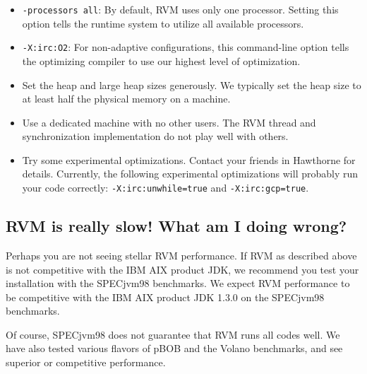\begin{itemize}
\item {\tt -processors all}: By default, RVM uses only one processor.  Setting this option tells the runtime system to utilize all available processors.
\item {\tt -X:irc:O2}: For non-adaptive configurations, this command-line option tells the optimizing compiler to use our highest level of optimization.
\item Set the heap and large heap sizes generously.  We typically set the heap size to at least half the physical memory on a machine.
\item Use a dedicated machine with no other users.  The RVM thread and synchronization implementation do not play well with others.
\item Try some experimental optimizations.  Contact your friends in Hawthorne
for details.  Currently, the following experimental optimizations will 
probably run your code correctly: {\tt -X:irc:unwhile=true} and {\tt -X:irc:gcp=true}.
\end{itemize}

\subsection{RVM is really slow! What am I doing wrong?}

Perhaps you are not seeing stellar RVM performance.  If RVM as described
above is not competitive with the IBM AIX product JDK, we recommend
you test your installation with the SPECjvm98 benchmarks.
We expect RVM performance to be competitive with the IBM AIX product JDK 1.3.0 on the SPECjvm98 benchmarks. 

Of course, SPECjvm98 does not guarantee that RVM runs all codes
well.  We have also tested various flavors of pBOB and the Volano
benchmarks, and see superior or competitive performance.

